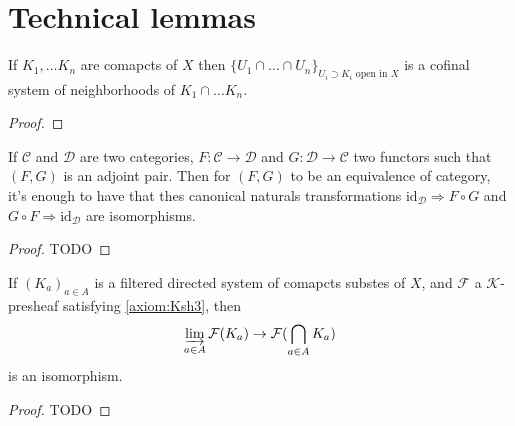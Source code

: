 \section{Technical lemmas}

\begin{lemma}
    \label{lem:cofinal_syst_of_inter_compact}
    If $K_1,\ldots K_n$ are comapcts of $X$ then $\{U_1\cap\ldots\cap U_n\}_{U_i\supset K_i\text{ open in }X}$ is a cofinal system of neighborhoods of $K_1\cap \ldots K_n$.
\end{lemma}

\begin{proof}


\end{proof}

\begin{lemma}
    \label{lem:equiv_of_adj}
    If $\mathcal{C}$ and $\mathcal{D}$ are two categories, $F:\mathcal{C}\to \mathcal{D}$ and $G:\mathcal{D}\to \mathcal{C}$ two functors such that $(F,G)$ is an adjoint pair. Then for $(F,G)$ to be an equivalence of category, it's enough to have that thes canonical naturals transformations $\text{id}_{\mathcal{D}}\Rightarrow F\circ G$ and $G\circ F\Rightarrow \text{id}_{\mathcal{D}}$ are isomorphisms.
\end{lemma}

\begin{proof}
    TODO%
\end{proof}

\begin{lemma}
    \label{lem:a_nommer}
    If $(K_a)_{a\in A}$ is a filtered directed system of comapcts substes of $X$, and $\mathcal{F}$ a $\mathcal{K}$-presheaf satisfying \eqref{axiom:Ksh3}, then \[\varinjlim\limits_{a\in A}\mathcal{F}(K_a)\to \mathcal{F}(\bigcap\limits_{a\in A}K_a)\] is an isomorphism.
\end{lemma}
\begin{proof}
    TODO
\end{proof}

